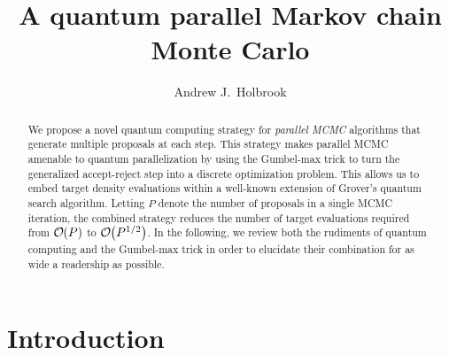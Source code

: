 \documentclass[12pt]{article} %
\title{A quantum parallel Markov chain Monte Carlo}
\date{}
\author{Andrew J.~Holbrook}
\affil{UCLA Biostatistics}
\newcommand{\order}[1]{{\cal O}\hspace{-0.2em}\left( #1 \right)}
\begin{document}
\maketitle




\begin{abstract}

We propose a novel quantum computing strategy for \emph{parallel MCMC} algorithms that generate multiple proposals at each step. This strategy makes parallel MCMC amenable to quantum parallelization by using the Gumbel-max trick to turn the generalized accept-reject step into a discrete optimization problem.  This allows us to embed target density evaluations within a well-known extension of Grover's quantum search algorithm.  Letting $P$ denote the number of proposals in a single MCMC iteration, the combined strategy reduces the number of target evaluations required from $\order{P}$ to $\order{P^{1/2}}$.  In the following, we review both the rudiments of quantum computing and the Gumbel-max trick in order to elucidate their combination for as wide a readership as possible. 


\end{abstract}


\section{Introduction}

\newcommand{\ttheta}{\boldsymbol{\theta}}
\newcommand{\dd}{\mbox{d}}
\newcommand{\ppsi}{\boldsymbol{\psi}}
\newcommand{\U}{\mathbf{U}}
\newcommand{\I}{\mathbf{I}}
\renewcommand{\H}{\mathbf{H}}
\newcommand{\A}{\mathbf{A}}
\newcommand{\B}{\mathbf{B}}
\newcommand{\G}{\mathbf{G}}
\newcommand{\ppi}{\boldsymbol{\pi}}
\newcommand{\llambda}{\boldsymbol{\lambda}}
\end{document}
